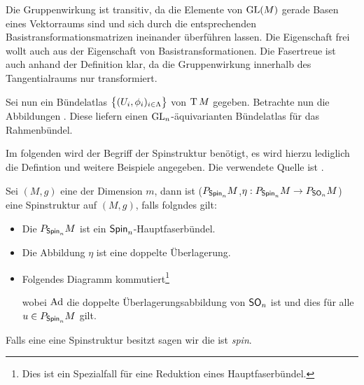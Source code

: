 \begin{Bsp}
\begin{enumerate}[1)]
\begin{smallproof}
			Die Gruppenwirkung ist transitiv, da die Elemente
			von $\operatorname{GL}(M)$ gerade Basen eines Vektorraums sind
			und sich durch die entsprechenden Basistransformationsmatrizen ineinander überführen
			lassen. Die Eigenschaft frei wollt auch aus
			der Eigenschaft von Basistransformationen. Die
			Fasertreue ist auch anhand der Definition klar, 
			da die Gruppenwirkung innerhalb des Tangentialraums
			nur transformiert.
			
			Sei nun ein Bündelatlas $ \bigl\{ (U_i,\phi_i)_{i\in \Lambda} \bigr\} $ von $ \operatorname{T} M $ gegeben. Betrachte
			nun die Abbildungen
			. Diese liefern einen
			$ \operatorname{GL}_n $-äquivarianten Bündelatlas für das Rahmenbündel.
			
		\end{smallproof}
		
	\end{enumerate}
\end{Bsp}


Im folgenden wird der Begriff der Spinstruktur benötigt, es wird
hierzu lediglich die Defintion und weitere Beispiele angegeben.
Die verwendete Quelle ist \cite{BHMMM15}.
\begin{Def}[Spinstruktur]
	Sei $(M,g)$ eine \RMF der Dimension $m$, dann ist
	 ($P_{\operatorname{\sf Spin}_{ n }}M$,$\eta : P_{\operatorname{\sf Spin}_{ n }}M \rightarrow P_{\operatorname{\sf SO}_{ n }}M$) eine Spinstruktur auf $(M,g)$, falls folgndes gilt:
	 \begin{itemize}
	 	\item Die \mfg $P_{\operatorname{\sf Spin}_{ n }}M$ ist ein $\operatorname{\sf Spin}_{ n }$-Hauptfaserbündel.
	 	\item Die Abbildung $\eta$ ist eine doppelte Überlagerung.
	 	\item Folgendes Diagramm kommutiert\footnote{Dies ist ein Spezialfall für eine Reduktion eines Hauptfaserbündel.}\\
		 	\begin{center}
			 \end{center}
			wobei $\operatorname{Ad}$ die doppelte Überlagerungsabbildung von $\operatorname{\sf SO}_{ n }$ ist
			und dies für alle $u \in P_{\operatorname{\sf Spin}_{ n }}M$ gilt.
	 \end{itemize}
	 Falls eine \RMF eine Spinstruktur besitzt sagen wir die \mfg ist \textit{spin}.
	

\end{Def}

